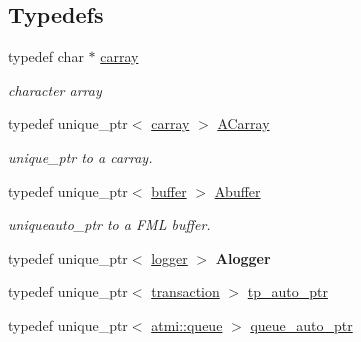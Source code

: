 \subsection*{Typedefs}
\begin{DoxyCompactItemize}
\item 
\hypertarget{namespaceatmi_a8b57f9a4e2453d8e5d82ac0016e35e87}{typedef char $\ast$ \hyperlink{namespaceatmi_a8b57f9a4e2453d8e5d82ac0016e35e87}{carray}}\label{namespaceatmi_a8b57f9a4e2453d8e5d82ac0016e35e87}

\begin{DoxyCompactList}\small\item\em character array \end{DoxyCompactList}\item 
\hypertarget{namespaceatmi_a374230d2a2355a879f42c829eb2d70ff}{typedef unique\+\_\+ptr$<$ \hyperlink{namespaceatmi_a8b57f9a4e2453d8e5d82ac0016e35e87}{carray} $>$ \hyperlink{namespaceatmi_a374230d2a2355a879f42c829eb2d70ff}{A\+Carray}}\label{namespaceatmi_a374230d2a2355a879f42c829eb2d70ff}

\begin{DoxyCompactList}\small\item\em unique\+\_\+ptr to a carray. \end{DoxyCompactList}\item 
\hypertarget{namespaceatmi_a268bae34ffaa2c2e72fabbcb54841934}{typedef unique\+\_\+ptr$<$ \hyperlink{classatmi_1_1buffer}{buffer} $>$ \hyperlink{namespaceatmi_a268bae34ffaa2c2e72fabbcb54841934}{Abuffer}}\label{namespaceatmi_a268bae34ffaa2c2e72fabbcb54841934}

\begin{DoxyCompactList}\small\item\em uniqueauto\+\_\+ptr to a F\+M\+L buffer. \end{DoxyCompactList}\item 
\hypertarget{namespaceatmi_ab58c19780ca31f0a223e218226fdf7a5}{typedef unique\+\_\+ptr$<$ \hyperlink{classatmi_1_1logger}{logger} $>$ {\bfseries Alogger}}\label{namespaceatmi_ab58c19780ca31f0a223e218226fdf7a5}

\item 
typedef unique\+\_\+ptr$<$ \hyperlink{classatmi_1_1transaction}{transaction} $>$ \hyperlink{namespaceatmi_a4a71d76e59908eb5ec5e53269c2742b5}{tp\+\_\+auto\+\_\+ptr}
\item 
typedef unique\+\_\+ptr$<$ \hyperlink{classatmi_1_1queue}{atmi\+::queue} $>$ \hyperlink{namespaceatmi_a9eff55eddc901da817f1b087613b18cc}{queue\+\_\+auto\+\_\+ptr}
\end{DoxyCompactItemize}
